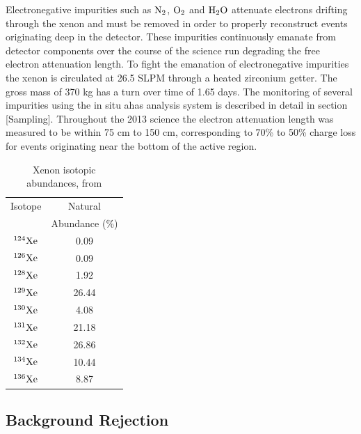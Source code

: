 Electronegative impurities such as $\rm N_2$, $\rm O_2$ and $\rm H_2O$ attenuate electrons drifting through the xenon and must be removed in order to properly reconstruct events originating deep in the detector. These impurities continuously emanate from detector components over the course of the science run degrading the free electron attenuation length. To fight the emanation of electronegative impurities the xenon is circulated at 26.5 SLPM through a heated zirconium getter. The gross mass of 370 kg has a turn over time of 1.65 days. The monitoring of several impurities using the in situ ahas analysis system is described in detail in section [Sampling]. Throughout the 2013 science the electron attenuation length was measured to be within 75 cm to 150 cm, corresponding to 70\% to 50\% charge loss for events originating near the bottom of the active region.

\renewcommand{\baselinestretch}{1}
\small\normalsize
\begin{table}[h!]
\begin{center}
\begin{tabular}{|c|c|}
\hline
Isotope & Natural \\
		& Abundance (\%) \\ \hline
$\rm^{124}Xe$ & 0.09 \\ \hline
$\rm^{126}Xe$ & 0.09 \\ \hline
$\rm^{128}Xe$ & 1.92 \\ \hline
$\rm^{129}Xe$ & 26.44 \\ \hline
$\rm^{130}Xe$ & 4.08 \\ \hline
$\rm^{131}Xe$ & 21.18 \\ \hline
$\rm^{132}Xe$ & 26.86 \\ \hline
$\rm^{134}Xe$ & 10.44 \\ \hline
$\rm^{136}Xe$ & 8.87 \\ \hline
\end{tabular}
\caption{Xenon isotopic abundances, from \cite{Xe_Isotopes}}
\label{table:Xe_Isotopes}
\end{center}
\end{table}
\renewcommand{\baselinestretch}{2}
\small\normalsize


\subsection{Background Rejection}

